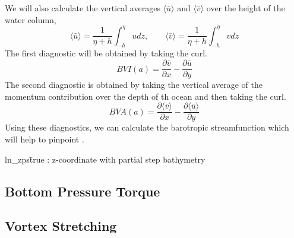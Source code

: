\documentclass[..\EOYR.tex]{subfiles}
\begin{document}
We will also calculate the vertical averages $\langle\bar{u}\rangle$ and $\langle\bar{v}\rangle$ over the height of the water column, 
\begin{equation}
	\langle\bar{u}\rangle = \frac{1}{\eta + h}\int_{-h}^{\eta}u dz ,\qquad \langle\bar{v}\rangle = \frac{1}{\eta + h}\int_{-h}^{\eta}v dz
\end{equation}
The first diagnostic will be obtained by taking  the curl.
\begin{equation}
	BVI(a) = \frac{\partial \bar{v}}{\partial x} - \frac{\partial \bar{u}}{\partial y}
\end{equation}
The second diagnostic is obtained by taking the vertical average of the momentum contribution over the depth  of th ocean and then taking  the curl. 
\begin{equation}
	BVA(a) = \frac{\partial \langle\bar{v}\rangle}{\partial x} - \frac{\partial \langle\bar{u}\rangle}{\partial y}
\end{equation}
	Using these diagnostics, we can calculate the barotropic  streamfunction which will help to pinpoint .

	ln\_zps\=true : z-coordinate with partial step bathymetry

\subsection{Bottom Pressure Torque}
\subsection{Vortex Stretching}
\end{document}
